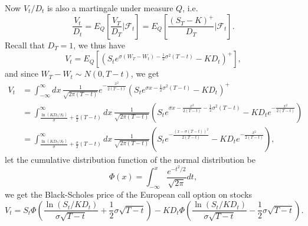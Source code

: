 Now $V_t/D_t$ is also a martingale under measure $Q$, i.e.
\[
  \frac{V_t}{D_t} = E_Q\left[ \frac{V_T}{D_T} \bigg| \mathcal{F}_t \right]
    = E_Q\left[ \frac{(S_T-K)^+}{D_T} \bigg| \mathcal{F}_t \right].
\]
Recall that $D_T=1$, we thus have
\[
  V_t =  E_Q
    \left[ 
      \left( S_t e^{\sigma (W_T-W_t) -\frac{1}{2} \sigma^2 (T-t)} - K D_t \right)^+ 
    \right],
\]
and since $W_T-W_t\sim N(0,T-t)$, we get
\begin{align*}
  V_t 
   &= \int_{-\infty}^{\infty} dx \, \frac{1}{\sqrt{2\pi (T-t)}} 
        e^{-\frac{x^2}{2(T-t)}} 
      \left( S_t e^{\sigma x -\frac{1}{2} \sigma^2 (T-t)} - K D_t \right)^+  \\
   &= \int_{\frac{\ln (KD_t/S_t)}{\sigma} + \frac{\sigma}{2}(T-t) }^{\infty} 
        dx \, \frac{1}{\sqrt{2\pi (T-t)}} 
      \left( S_t e^{\sigma x  -\frac{x^2}{2(T-t)} -\frac{1}{2} \sigma^2 (T-t)} 
        - K D_t e^{-\frac{x^2}{2(T-t)}} \right)       \\
   &= \int_{\frac{\ln (KD_t/S_t)}{\sigma} + \frac{\sigma}{2}(T-t) }^{\infty} 
        dx \, \frac{1}{\sqrt{2\pi (T-t)}} 
      \left( S_t e^{ -\frac{(x-\sigma (T-t))^2}{2(T-t)} } 
        - K D_t e^{-\frac{x^2}{2(T-t)}} \right), 
\end{align*}
let the cumulative distribution function of the normal distribution be
\begin{equation}
  \Phi(x)= \int_{-\infty}^x \frac{e^{-t^2/2}}{\sqrt{2\pi}} dt,
\end{equation}
we get the Black-Scholes price of the European call option on stocks
\begin{equation}
  V_t = 
    S_t \Phi 
    \left(  
      \frac{\ln (S_t/KD_t)}{\sigma \sqrt{T-t}} + \frac{1}{2} \sigma \sqrt{T-t}  
    \right)
    - K D_t \Phi 
    \left(  
      \frac{\ln (S_t/KD_t)}{\sigma \sqrt{T-t}} - \frac{1}{2} \sigma \sqrt{T-t}  
    \right).
\end{equation}


